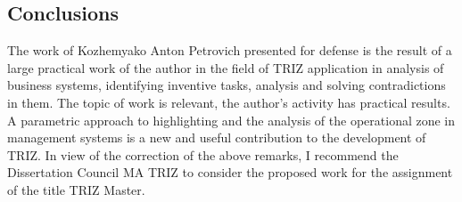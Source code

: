\subsection*{Conclusions}
The work of Kozhemyako Anton Petrovich presented for defense is the result of
a large practical work of the author in the field of TRIZ application in
analysis of business systems, identifying inventive tasks, analysis and
solving contradictions in them. The topic of work is relevant, the author’s
activity has practical results. A parametric approach to highlighting and the
analysis of the operational zone in management systems is a new and useful
contribution to the development of TRIZ.  In view of the correction of the
above remarks, I recommend the Dissertation Council MA TRIZ to consider the
proposed work for the assignment of the title TRIZ Master.
